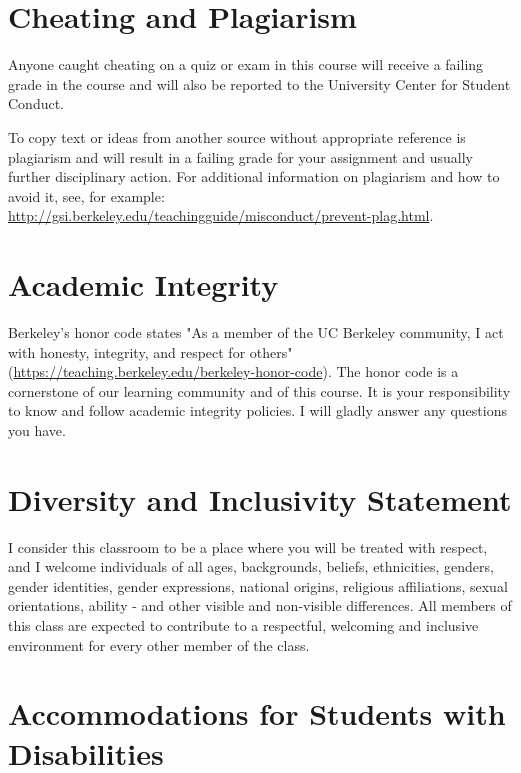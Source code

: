 \documentclass[letterpaper]{inzane_syllabus} %
\begin{document}
\vspace{0.5cm}
\section{Cheating and Plagiarism}

Anyone caught cheating on a quiz or exam in this course will receive a failing grade in the course and will also be reported to the University Center for Student Conduct.

To copy text or ideas from another source without appropriate reference is plagiarism and will result in a failing grade for your assignment and usually further disciplinary action. For additional information on plagiarism and how to avoid it, see, for
example: \url{http://gsi.berkeley.edu/teachingguide/misconduct/prevent-plag.html}.

\vspace{0.5cm}
\section{Academic Integrity}

Berkeley's honor code states "As a member of the UC Berkeley community, I act with honesty, integrity, and respect for others" (\url{https://teaching.berkeley.edu/berkeley-honor-code}). The honor code is a cornerstone of our learning community and of this course. It is your responsibility to know and follow academic integrity policies. I will gladly answer any questions you have.\\

\vspace{0.5cm}
\section{Diversity and Inclusivity Statement}

I consider this classroom to be a place where you will be treated with respect, and I welcome individuals of all ages, backgrounds, beliefs, ethnicities, genders, gender identities, gender expressions, national origins, religious affiliations, sexual orientations, ability - and other visible and non-visible differences. All members of this class are expected to contribute to a respectful, welcoming and inclusive environment for every other member of the class. 

\vspace{0.5cm}
\section{Accommodations for Students with Disabilities}
\end{document}
